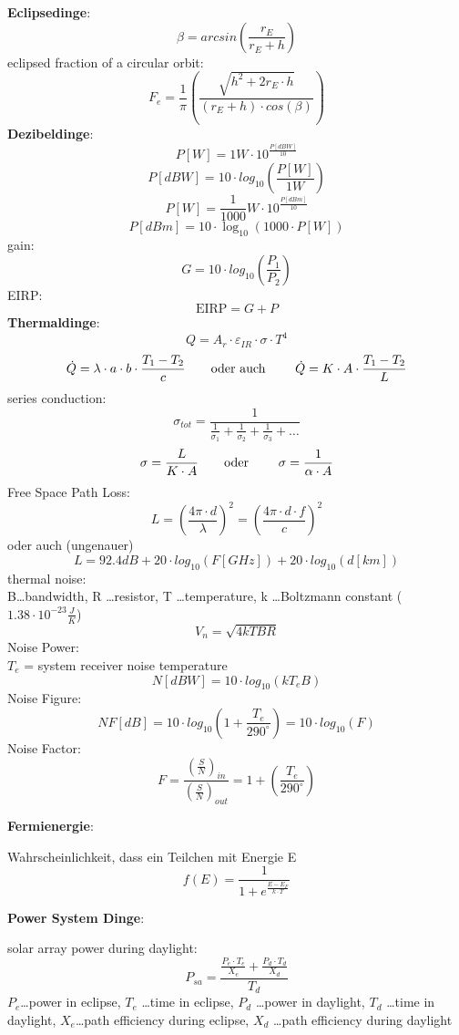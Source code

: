 \documentclass[a4paper,10pt]{article}
\newcommand{\f}{\textbf}
\begin{document}
\f{Eclipsedinge}:
\[\beta = arcsin\left(\frac{r_E}{r_E+h}\right)\]
eclipsed fraction of a circular orbit:
\[F_e = \frac{1}{\pi}\left(\frac{\sqrt{h^2 +2r_E\cdot h}}{(r_E + h)\cdot cos(\beta)} \right)\]
\f{Dezibeldinge}:
\[P[W] = 1W\cdot 10^{\frac{P[dBW]}{10}}\]
\[P[dBW] = 10\cdot log_{10}\left(\frac{P[W]}{1W}\right)\]
\[P[W] = \frac{1}{1000} W \cdot 10^{\frac{P[dBm]}{10}}\]
\[P[dBm] = 10\cdot \log_{10}(1000\cdot P[W])\]
gain:
\[G = 10\cdot log_{10}\left(\frac{P_1}{P_2}\right)\]
EIRP: 
\[\text{EIRP} = G + P\]
\f{Thermaldinge}:
\[Q = A_r\cdot \varepsilon_{IR}\cdot \sigma \cdot T^4\]
\[\dot{Q} = \lambda\cdot a\cdot b \cdot \frac{T_1-T_2}{c} \text{\qquad oder auch \qquad} \dot{Q} = K \cdot A \cdot \frac{T_1-T_2}{L}\]
series conduction:
\[\sigma_{tot} = \frac{1}{\frac{1}{\sigma_1} + \frac{1}{\sigma_2} + \frac{1}{\sigma_3} + \dots}\]
\[\sigma = \frac{L}{K\cdot A} \text{\qquad oder \qquad} \sigma = \frac{1}{\alpha\cdot A}\]
Free Space Path Loss:
\[L = \left(\frac{4\pi\cdot d}{\lambda}\right)^2 = \left(\frac{4\pi\cdot d\cdot f}{c}\right)^2\] 
oder auch (ungenauer)
\[L = 92.4dB + 20\cdot log_{10}(F[GHz]) + 20\cdot log_{10}(d[km])\]
thermal noise:\\
B\dots bandwidth, R \dots resistor, T \dots temperature, k \dots Boltzmann constant ($1.38\cdot 10^{-23}\frac{J}{K}$)
\[V_n = \sqrt{4kTBR}\]
Noise Power:\\
$T_e$ = system receiver noise temperature
\[N[dBW] = 10\cdot log_{10}(kT_eB)\]
Noise Figure:\\
\[NF[dB] = 10\cdot log_{10}\left(1 + \frac{T_e}{290^{\circ}}\right) = 10\cdot log_{10}(F)\]
Noise Factor:
\[F = \frac{\left(\frac{S}{N}\right)_{in}}{\left(\frac{S}{N}\right)_{out}} = 1 + \left(\frac{T_e}{290^{\circ}}\right)\]
\vspace*{5pt}

\noindent %
\f{Fermienergie}:\\
\vspace*{3pt}

\noindent Wahrscheinlichkeit, dass ein Teilchen mit Energie E 
\[f(E) = \frac{1}{1 + e^{\frac{E-E_F}{k\cdot T}}}\]
\vspace*{5pt}

\noindent \f{Power System Dinge}:\\
\vspace*{3pt}

\noindent solar array power during daylight:
\[P_{sa} = \frac{\frac{P_e\cdot T_e}{X_e}+ \frac{P_d\cdot T_d}{X_d}}{T_d}\]
$P_e$\dots power in eclipse, $T_e$ \dots time in eclipse, $P_d$ \dots power in daylight, $T_d$ \dots time in daylight, $X_e$\dots path efficiency during eclipse, $X_d$ \dots path 
efficiency during daylight\\
\vspace*{5pt}
\end{document}
